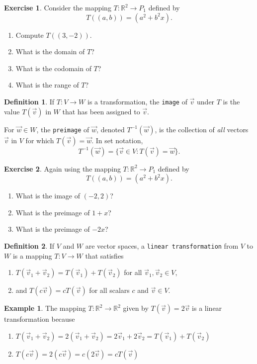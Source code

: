 \documentclass{beamer}
\newcommand{\R}{\mathbb{R}}
\newcommand{\fn}{\insertframenumber}
\theoremstyle{definition}
\newtheorem{exercise}{Exercise}
\newtheorem*{defn}{Definition}
\newtheorem*{exa}{Example}
\renewcommand{\emph}[1]{{\color{blue}\texttt{#1}}}
\begin{document}
\begin{frame}{\fn}
	\begin{exercise}
		Consider the mapping $T:\R^2\to P_1$ defined by $$T((a,b))=(a^2+b^2x).$$
			\begin{enumerate}[label=(\alph*)]
				\item Compute $T((3,-2))$.
				\item What is the domain of $T$?
				\item What is the codomain of $T$?
				\item What is the range of $T$?
			\end{enumerate}
	\end{exercise}
\end{frame}
\begin{frame}{\fn}
	\begin{defn}
		If $T:V\to W$ is a transformation, the \emph{image} of $\vec v$ under $T$ is the value $T(\vec v)$ in $W$ that has been assigned to $\vec v$.
		
		For $\vec w\in W$, the \emph{preimage} of $\vec w$, denoted $T^{-1}(\vec w)$, is the collection of \textit{all} vectors $\vec v$ in $V$ for which $T(\vec v)=\vec w$.  
		In set notation, \[T^{-1}(\vec w)=\{\vec v\in V : T(\vec v)=\vec w\}.\]
	\end{defn}
	\begin{exercise}
	Again using the mapping $T:\R^2\to P_1$ defined by $$T((a,b))=(a^2+b^2x).$$
		\begin{enumerate}[label=(\alph*)]
			\item What is the image of $(-2,2)$?
			\item What is the preimage of $1+x$?
			\item What is the preimage of $-2x$?
		\end{enumerate}
	\end{exercise}
\end{frame}
\begin{frame}{\fn}
	\begin{defn}
		If $V$ and $W$ are vector spaces, a \emph{linear transformation} from $V$ to $W$ is a mapping $T\colon V\to W$ that satisfies
			\begin{enumerate}[label=\textbf{\arabic*.}]
				\item $T(\vec v_1+\vec v_2)=T(\vec v_1)+T(\vec v_2)$ for all $\vec v_1,\vec v_2\in V$,
				\item and $T(c\vec v)=cT(\vec v)$ for all scalars $c$ and $\vec v\in V$.
			\end{enumerate}
	\end{defn}
	\begin{exa}
		The mapping $T:\R^2\to\R^2$ given by $T(\vec v)=2\vec v$ is a linear transformation because
		\begin{enumerate}[label=\textbf{\arabic*.}]
			\item $T(\vec v_1+\vec v_2)=2(\vec v_1+\vec v_2)=2\vec v_1+2\vec v_2=T(\vec v_1)+T(\vec v_2)$
			\item $T(c\vec v)=2(c\vec v)=c(2\vec v)=cT(\vec v)$
		\end{enumerate}
	\end{exa}
\end{frame}
\end{document}
